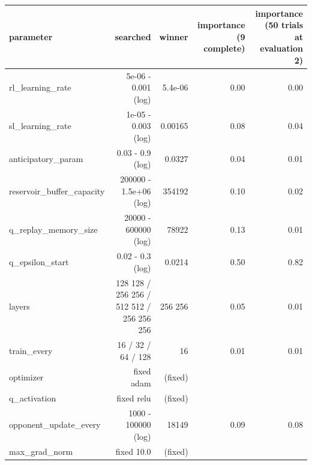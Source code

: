 \begin{tabular}{lrrrr}
\toprule
parameter & searched & winner & importance (9 complete) & importance (50 trials at evaluation 2) \\
\midrule
rl\_learning\_rate & 5e-06 - 0.001 (log) & 5.4e-06 & 0.00 & 0.00 \\
sl\_learning\_rate & 1e-05 - 0.003 (log) & 0.00165 & 0.08 & 0.04 \\
anticipatory\_param & 0.03 - 0.9 (log) & 0.0327 & 0.04 & 0.01 \\
reservoir\_buffer\_capacity & 200000 - 1.5e+06 (log) & 354192 & 0.10 & 0.02 \\
q\_replay\_memory\_size & 20000 - 600000 (log) & 78922 & 0.13 & 0.01 \\
q\_epsilon\_start & 0.02 - 0.3 (log) & 0.0214 & 0.50 & 0.82 \\
layers & 128 128 / 256 256 / 512 512 / 256 256 256 & 256 256 & 0.05 & 0.01 \\
train\_every & 16 / 32 / 64 / 128 & 16 & 0.01 & 0.01 \\
optimizer & fixed adam & (fixed) &  &  \\
q\_activation & fixed relu & (fixed) &  &  \\
opponent\_update\_every & 1000 - 100000 (log) & 18149 & 0.09 & 0.08 \\
max\_grad\_norm & fixed 10.0 & (fixed) &  &  \\
\bottomrule
\end{tabular}

